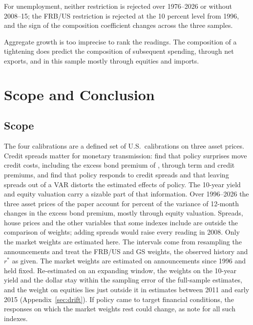 

For unemployment, neither restriction is rejected over 1976--2026 or without 2008--15; the FRB/US restriction is rejected at the 10 percent level from 1996, and the sign of the composition coefficient changes across the three samples.

Aggregate growth is too imprecise to rank the readings. The composition of a tightening does predict the composition of subsequent spending, through net exports, and in this sample mostly through equities and imports.
\FloatBarrier

\section{Scope and Conclusion}\label{sec:discussion}
\subsection{Scope}\label{sec:limits}
The four calibrations are a defined set of U.S.\ calibrations on three asset prices. Credit spreads matter for monetary transmission: \citet{gertler2015} find that policy surprises move credit costs, including the excess bond premium of \citet{gilchrist2012}, through term and credit premiums, and \citet{caldara2019} find that policy responds to credit spreads and that leaving spreads out of a VAR distorts the estimated effects of policy. The 10-year yield and equity valuation carry a sizable part of that information. Over 1996--2026 the three asset prices of the paper account for  percent of the variance of 12-month changes in the excess bond premium, mostly through equity valuation. Spreads, house prices and the other variables that some indexes include are outside the comparison of weights; adding spreads would raise every reading in 2008. Only the market weights are estimated here. The intervals come from resampling the  announcements and treat the FRB/US and GS weights, the observed history and $r^*$ as given. The market weights are estimated on announcements since 1996 and held fixed. Re-estimated on an expanding window, the weights on the 10-year yield and the dollar stay within the sampling error of the full-sample estimates, and the weight on equities lies just outside it in estimates between 2011 and early 2015 (Appendix~\ref{sec:drift}). If policy came to target financial conditions, the responses on which the market weights rest could change, as \citet{hatzius2010} note for all such indexes.


